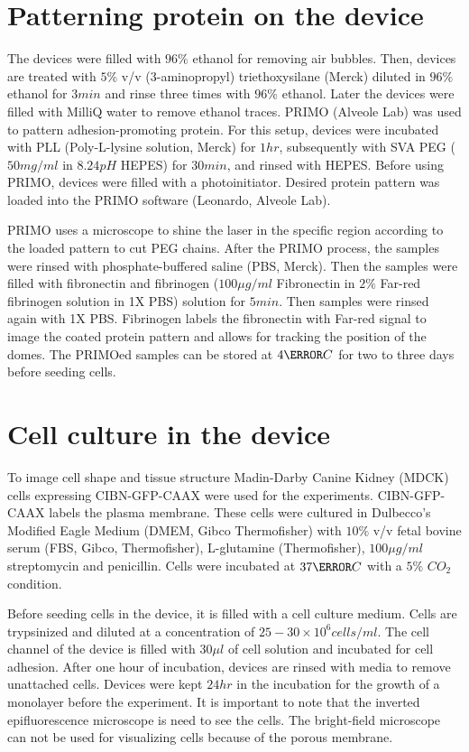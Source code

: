 \section{Patterning protein on the device}
The devices were filled with $96\%$ ethanol for removing air bubbles. Then, devices are treated with $5\%$ v/v (3-aminopropyl) triethoxysilane (Merck) diluted in $96\%$ ethanol for $3min$ and rinse three times with $96\%$ ethanol. Later the devices were filled with MilliQ water to remove ethanol traces. PRIMO (Alveole Lab) was used to pattern adhesion-promoting protein. For this setup, devices were incubated with PLL (Poly-L-lysine solution, Merck) for $1hr$, subsequently with SVA PEG ($50mg/ml$ in $8.24pH$ HEPES) for $30min$, and rinsed with HEPES. Before using PRIMO, devices were filled with a photoinitiator. Desired protein pattern was loaded into the PRIMO software (Leonardo, Alveole Lab). 

PRIMO uses a microscope to shine the laser in the specific region according to the loaded pattern to cut PEG chains. After the PRIMO process, the samples were rinsed with phosphate-buffered saline (PBS, Merck). Then the samples were filled with fibronectin and fibrinogen ($100\mu g/ml$ Fibronectin in $2\%$ Far-red fibrinogen solution in 1X PBS) solution for $5 min$. Then samples were rinsed again with 1X PBS. Fibrinogen labels the fibronectin with Far-red signal to image the coated protein pattern and allows for tracking the position of the domes. The PRIMOed samples can be stored at $4\degree C$ for two to three days before seeding cells.

\section{Cell culture in the device}

To image cell shape and tissue structure Madin-Darby Canine Kidney (MDCK) cells expressing CIBN-GFP-CAAX were used for the experiments. CIBN-GFP-CAAX labels the plasma membrane. These cells were cultured in Dulbecco’s Modified Eagle Medium (DMEM, Gibco Thermofisher) with $10\%$ v/v fetal bovine serum (FBS, Gibco, Thermofisher), L-glutamine (Thermofisher), $100\mu g/ml$ streptomycin and penicillin. Cells were incubated at $37\degree C$ with a $5\%$ $CO_2$ condition. 

Before seeding cells in the device, it is filled with a cell culture medium. Cells are trypsinized and diluted at a concentration of $25-30\times10^6 cells/ml$. The cell channel of the device is filled with $30\mu l$ of cell solution and incubated for cell adhesion. After one hour of incubation, devices are rinsed with media to remove unattached cells. Devices were kept $24hr$ in the incubation for the growth of a monolayer before the experiment. It is important to note that the inverted epifluorescence microscope is need to see the cells. The bright-field microscope can not be used for visualizing cells because of the porous membrane.

